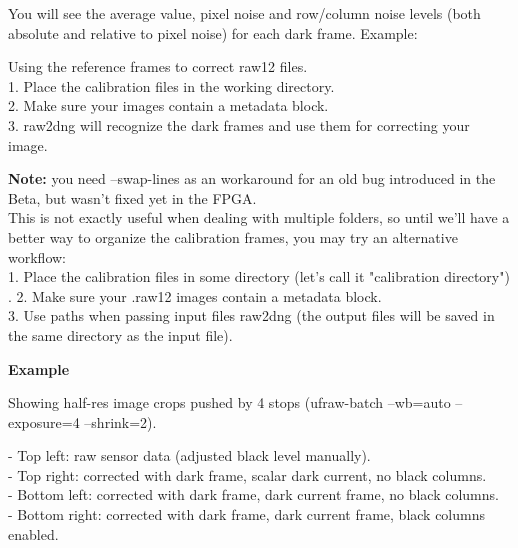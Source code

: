 You will see the average value, pixel noise and row/column noise levels (both absolute and relative to pixel noise) for each dark frame. Example:

    
Using the reference frames to correct raw12 files.\\

1. Place the calibration files in the working directory.\\
2. Make sure your  images contain a metadata block.\\
3. raw2dng will recognize the dark frames and use them for correcting your image. \\
   
    
\textbf{Note:} you need --swap-lines as an workaround for an old bug introduced in the Beta, but wasn't fixed yet in the FPGA.\\    
    
This is not exactly useful when dealing with multiple folders, so until we'll have a better way to organize the calibration frames, you may try an alternative workflow:\\

1. Place the calibration files in some directory (let's call it "calibration directory")\\.
2. Make sure your .raw12 images contain a metadata block.\\
3. Use paths when passing input files raw2dng (the output files will be saved in the same directory as the input file).\\

     
    
\textbf{Example}

Showing half-res image crops pushed by 4 stops (ufraw-batch --wb=auto --exposure=4 --shrink=2).

- Top left: raw sensor data (adjusted black level manually).\\
- Top right: corrected with dark frame, scalar dark current, no black columns.\\
- Bottom left: corrected with dark frame, dark current frame, no black columns.\\
- Bottom right: corrected with dark frame, dark current frame, black columns enabled.\\

